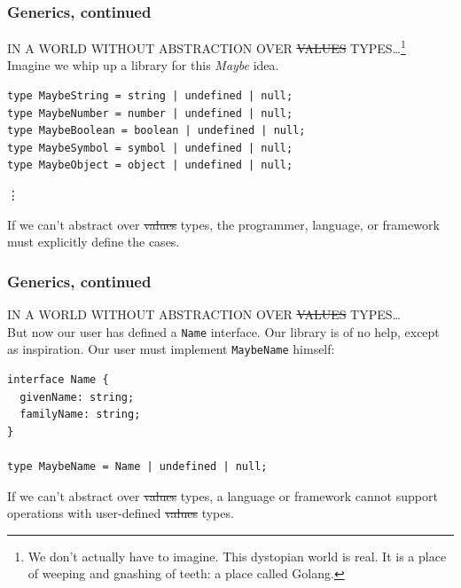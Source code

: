 \documentclass[aspectratio=169]{beamer}
\begin{document}
\begin{frame}[fragile]
  \frametitle{Generics, continued}
  IN A WORLD WITHOUT ABSTRACTION OVER \sout{VALUES} TYPES\ldots\footnote{We
    don't actually have to imagine. This dystopian world is real. It is a
    place of weeping and gnashing of teeth: a place called Golang.} \\

  Imagine we whip up a library for this \textit{Maybe} idea.

  \begin{verbatim}
type MaybeString = string | undefined | null;
type MaybeNumber = number | undefined | null;
type MaybeBoolean = boolean | undefined | null;
type MaybeSymbol = symbol | undefined | null;
type MaybeObject = object | undefined | null;
  \end{verbatim}
  \vdots

  \vspace{1em}

  \begin{tcolorbox}
    If we can't abstract over \sout{values} types, the programmer, language,
    or framework must explicitly define the cases.
  \end{tcolorbox}

\end{frame}

\begin{frame}[fragile]
  \frametitle{Generics, continued}
  \small
  IN A WORLD WITHOUT ABSTRACTION OVER \sout{VALUES} TYPES\ldots \\

  But now our user has defined a \texttt{Name} interface. Our library is of
  no help, except as inspiration. Our user must implement \texttt{MaybeName}
  himself: \\

  \begin{verbatim}
interface Name {
  givenName: string;
  familyName: string;
}

type MaybeName = Name | undefined | null;
  \end{verbatim}

  \vspace{1em}

  \begin{tcolorbox}
    If we can't abstract over \sout{values} types, a language or framework
    cannot support operations with user-defined \sout{values} types.
  \end{tcolorbox}
\end{frame}
\end{document}
